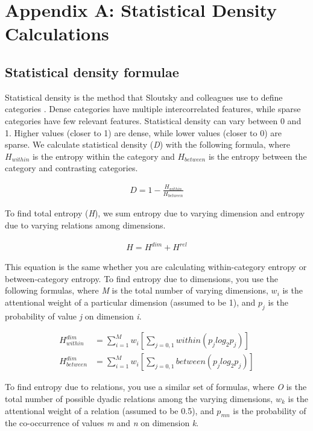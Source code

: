 \documentclass[../dissertation.tex]{subfiles}
\begin{document}
\section{Appendix A: Statistical Density Calculations} \label{appendixA}

\subsection{Statistical density formulae}

Statistical density is the method that Sloutsky and colleagues use to define categories \citep{Sloutsky2010}. Dense categories have multiple intercorrelated features, while sparse categories have few relevant features. Statistical density can vary between 0 and 1. Higher values (closer to 1) are dense, while lower values (closer to 0) are sparse. We calculate statistical density (\textit{D}) with the following formula, where $H_{within}$ is the entropy within the category and $H_{between}$ is the entropy between the category and contrasting categories.

\begin{align*}
D = 1 - \frac{H_{within}}{H_{between}}
\end{align*}

To find total entropy (\textit{H}), we sum entropy due to varying dimension and entropy due to varying relations among dimensions.

\begin{align*}
H = H^{dim} + H^{rel}
\end{align*}

This equation is the same whether you are calculating within-category entropy or between-category entropy. To find entropy due to dimensions, you use the following formulas, where \textit{M} is the total number of varying dimensions, $w_{i}$ is the attentional weight of a particular dimension (assumed to be 1), and $p_{j}$ is the probability of value \textit{j} on dimension \textit{i}.

\begin{align*}
H^{dim}_{within} &= \sum_{i=1}^{M}w_{i}[\sum_{j=0,1}within(p_{j}log_{2}p_{j})]\\
H^{dim}_{between} &= \sum_{i=1}^{M}w_{i}[\sum_{j=0,1}between(p_{j}log_{2}p_{j})]
\end{align*}

To find entropy due to relations, you use a similar set of formulas, where \textit{O} is the total number of possible dyadic relations among the varying dimensions, $w_{k}$ is the attentional weight of a relation (assumed to be 0.5), and $p_{mn}$ is the probability of the co-occurrence of values \textit{m} and \textit{n} on dimension \textit{k}.
\end{document}
